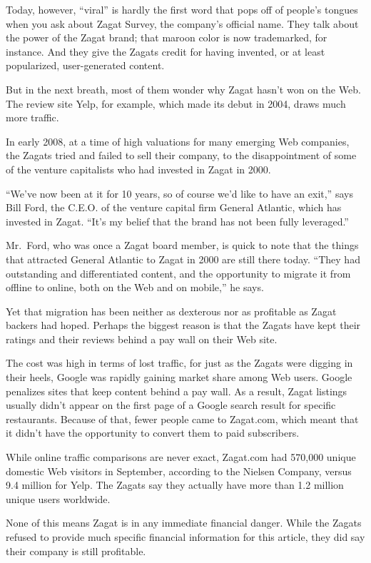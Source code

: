 ﻿\documentclass[12pt]{article}
\begin{document}
Today, however, ``viral'' is hardly the first word that pops off of people's tongues when you ask
about Zagat Survey, the company's official name. They talk about the power of the Zagat brand; that
maroon color is now trademarked, for instance. And they give the Zagats credit for having invented,
or at least popularized, user-generated content.

But in the next breath, most of them wonder why Zagat hasn't won on the Web. The review site Yelp,
for example, which made its debut in 2004, draws much more traffic.

In early 2008, at a time of high valuations for many emerging Web companies, the Zagats tried and
failed to sell their company, to the disappointment of some of the venture capitalists who had
invested in Zagat in 2000.

``We've now been at it for 10 years, so of course we'd like to have an exit,'' says Bill Ford, the
C.E.O. of the venture capital firm General Atlantic, which has invested in Zagat. ``It's my belief
that the brand has not been fully leveraged.''

Mr.~Ford, who was once a Zagat board member, is quick to note that the things that attracted General
Atlantic to Zagat in 2000 are still there today. ``They had outstanding and differentiated content,
and the opportunity to migrate it from offline to online, both on the Web and on mobile,'' he says.

Yet that migration has been neither as dexterous nor as profitable as Zagat backers had hoped.
Perhaps the biggest reason is that the Zagats have kept their ratings and their reviews behind a pay
wall on their Web site.

The cost was high in terms of lost traffic, for just as the Zagats were digging in their heels,
Google was rapidly gaining market share among Web users. Google penalizes sites that keep content
behind a pay wall. As a result, Zagat listings usually didn't appear on the first page of a Google
search result for specific restaurants. Because of that, fewer people came to Zagat.com, which meant
that it didn't have the opportunity to convert them to paid subscribers.

While online traffic comparisons are never exact, Zagat.com had 570,000 unique domestic Web visitors
in September, according to the Nielsen Company, versus 9.4 million for Yelp. The Zagats say they
actually have more than 1.2 million unique users worldwide.

None of this means Zagat is in any immediate financial danger. While the Zagats refused to provide
much specific financial information for this article, they did say their company is still
profitable.
\end{document}
